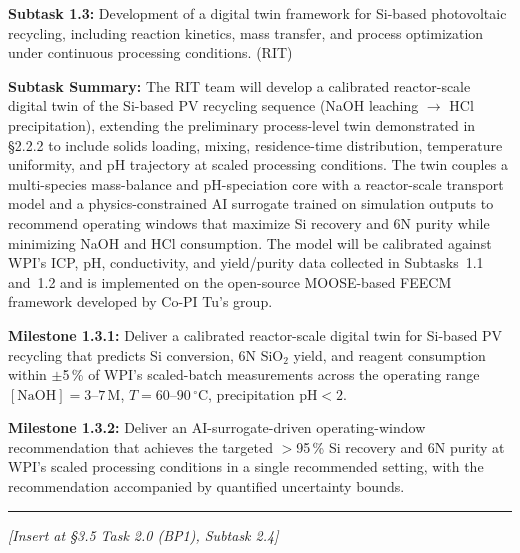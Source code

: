 \documentclass[11pt]{article}
\begin{document}
\noindent\textbf{Subtask 1.3:} Development of a digital twin framework
for Si-based photovoltaic recycling, including reaction kinetics, mass
transfer, and process optimization under continuous processing
conditions. (RIT)\par

\noindent\textbf{Subtask Summary:} The RIT team will develop a
calibrated reactor-scale digital twin of the Si-based PV recycling
sequence (NaOH leaching $\rightarrow$ HCl precipitation), extending the
preliminary process-level twin demonstrated in \S2.2.2 to include solids
loading, mixing, residence-time distribution, temperature uniformity,
and pH trajectory at scaled processing conditions. The twin couples a
multi-species mass-balance and pH-speciation core with a reactor-scale
transport model and a physics-constrained AI surrogate trained on
simulation outputs to recommend operating windows that maximize Si
recovery and 6N purity while minimizing NaOH and HCl consumption. The
model will be calibrated against WPI's ICP, pH, conductivity, and
yield/purity data collected in Subtasks~1.1 and~1.2 and is implemented
on the open-source MOOSE-based \textsc{FEECM} framework developed by
Co-PI Tu's group.\par

\noindent\textbf{Milestone 1.3.1:} Deliver a calibrated reactor-scale
digital twin for Si-based PV recycling that predicts Si conversion, 6N
SiO$_2$ yield, and reagent consumption within $\pm$5\,\% of WPI's
scaled-batch measurements across the operating range
$[\mathrm{NaOH}] = 3$--$7$\,M, $T = 60$--$90\,^\circ$C, precipitation
$\mathrm{pH} < 2$.\par

\noindent\textbf{Milestone 1.3.2:} Deliver an AI-surrogate-driven
operating-window recommendation that achieves the targeted $>$95\,\% Si
recovery and 6N purity at WPI's scaled processing conditions in a
single recommended setting, with the recommendation accompanied by
quantified uncertainty bounds.

\vspace{1em}\noindent\rule{0.4\textwidth}{0.4pt}\vspace{0.6em}


\noindent\textit{[Insert at \S3.5 Task 2.0 (BP1), Subtask 2.4]}\par
\end{document}
